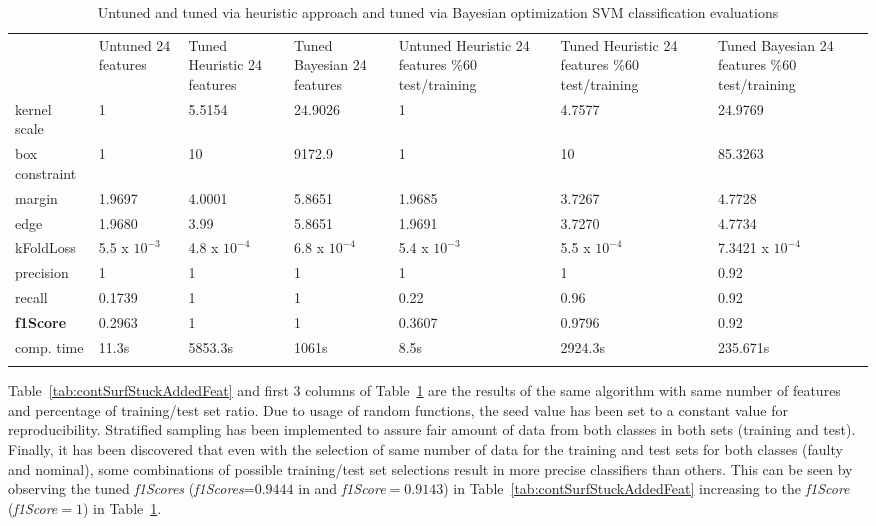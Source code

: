 \begin{table}
	\centering
\caption{Untuned and tuned via heuristic approach and tuned via Bayesian optimization SVM classification evaluations}
\label{tab:contSurfStuckAddedFeatDiffPercentage}       %
\begin{tabular}{p{1.5cm}p{2cm}p{2.3cm}p{2.3cm}p{2.3cm}p{2.3cm}p{2.4cm}}
\hline\noalign{\smallskip}
 & Untuned  24 features & Tuned Heuristic 24 features & Tuned Bayesian 24 features & Untuned Heuristic 24 features \%60 test/training & Tuned Heuristic 24 features \%60 test/training & Tuned Bayesian 24 features \%60 test/training\\
\noalign{\smallskip}\hline\noalign{\smallskip}
kernel scale & 1 & 5.5154 & 24.9026 & 1 & 4.7577 & 24.9769\\
box constraint & 1 & 10 & 9172.9 & 1 & 10 & 85.3263\\
margin & 1.9697 & 4.0001 & 5.8651& 1.9685 & 3.7267 & 4.7728\\
edge & 1.9680 & 3.99 & 5.8651 & 1.9691 & 3.7270 & 4.7734\\
kFoldLoss & 5.5 x $10^{-3}$ & 4.8 x $10^{-4}$ & 6.8 x $10^{-4}$ & 5.4 x $10^{-3}$ & 5.5 x $10^{-4}$ & 7.3421 x $10^{-4}$\\
precision & 1 & 1 & 1 & 1 & 1 & 0.92\\
recall & 0.1739 & 1 & 1 & 0.22 & 0.96 & 0.92\\
\textbf{f1Score} & 0.2963 & 1 & 1 & 0.3607 & 0.9796 & 0.92\\
comp. time & 11.3s & 5853.3s & 1061s & 8.5s & 2924.3s & 235.671s\\
\noalign{\smallskip}\hline
\end{tabular}
\end{table}


Table~\ref{tab:contSurfStuckAddedFeat} and first 3 columns of Table~\ref{tab:contSurfStuckAddedFeatDiffPercentage} are the results of the same algorithm with same number of features and percentage of training/test set ratio. 
Due to usage of random functions, the seed value has been set to a constant value for reproducibility. 
Stratified sampling has been implemented to assure fair amount of data from both classes in both sets (training and test). 
Finally, it has been discovered that even with the selection of same number of data for the training and test sets for both classes (faulty and nominal), some combinations of possible training/test set selections result in more precise classifiers than others. 
This can be seen by observing the tuned \emph{f1Scores} (\emph{f1Scores}=$0.9444$ in and \emph{f1Score}$=0.9143$) in Table~\ref{tab:contSurfStuckAddedFeat} increasing to the \emph{f1Score} (\emph{f1Score}$=1$) in Table~\ref{tab:contSurfStuckAddedFeatDiffPercentage}.


